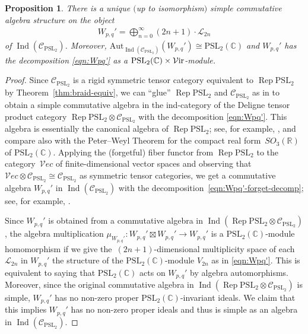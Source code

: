 \documentclass[pdftex]{sigma}
\numberwithin{equation}{section}
\newtheorem{Proposition}[Theorem]{Proposition}
\theoremstyle{definition}
\begin{document}
\begin{Proposition}\label{prop2}
There is a unique $($up to isomorphism$)$ simple commutative algebra structure on the object
\begin{gather}\label{eqn:Wpq'-forget-decomp}
W_{p,q}' =\bigoplus_{n=0}^\infty (2n+1)\cdot\mathcal{L}_{2n}
\end{gather}
of $\operatorname{Ind}(\mathcal{C}_{\mathrm{PSL}_2})$. Moreover, $\mathrm{Aut}_{\operatorname{Ind}(\mathcal{C}_{\mathrm{PSL}_2})}(W_{p,q}')\cong \mathrm{PSL}_2(\mathbb{C})$ and $W_{p,q}'$ has the decomposition \eqref{eqn:Wpq'} as a $\mathrm{PSL}_2(\mathbb{C})\times\mathcal{V}{\rm ir}$-module.
\end{Proposition}
\begin{proof}
Since $\mathcal{C}_{\mathrm{PSL}_2}$ is a rigid symmetric tensor category equivalent to $\operatorname{Rep} \mathrm{PSL}_2$ by Theorem~\ref{thm:braid-equiv}, we can ``glue'' $\operatorname{Rep} \mathrm{PSL}_2$ and $\mathcal{C}_{\mathrm{PSL}_2}$ as in \cite[Main Theorem 1]{CKM2} to obtain a simple commutative algebra in the ind-category of the Deligne tensor product category $\operatorname{Rep} \mathrm{PSL}_2\otimes\mathcal{C}_{\mathrm{PSL}_2}$ with the decomposition \eqref{eqn:Wpq'}. This algebra is essentially the canonical algebra of
$\operatorname{Rep} \mathrm{PSL}_2$; see, for example, \cite[Section 7.9]{EGNO}, and compare also with the Peter--Weyl Theorem for the compact real form~$SO_3(\mathbb{R})$ of $\mathrm{PSL}_2(\mathbb{C})$.
Applying the (forgetful) fiber functor from $\operatorname{Rep} \mathrm{PSL}_2$ to the category~$\mathcal{V}ec$ of finite-dimensional vector spaces and observing that~$\mathcal{V}ec\otimes\mathcal{C}_{\mathrm{PSL}_2}\cong\mathcal{C}_{\mathrm{PSL}_2}$ as symmetric tensor categories, we get a commutative algebra $W_{p,q}'$ in $\operatorname{Ind}(\mathcal{C}_{\mathrm{PSL}_2})$ with the decomposition~\eqref{eqn:Wpq'-forget-decomp}; see, for example, \cite[Appendix A]{MY-25-Vir}.

Since $W_{p,q}'$ is obtained from a commutative algebra in $\operatorname{Ind}(\operatorname{Rep} \mathrm{PSL}_2\otimes\mathcal{C}_{\mathrm{PSL}_2})$, the algebra multiplication $\mu_{W_{p,q}'}\colon W_{p,q}'\boxtimes W_{p,q}'\rightarrow W_{p,q}'$ is a $\mathrm{PSL}_2(\mathbb{C})$-module homomorphism if we give the~$(2n+1)$-dimensional multiplicity space of each $\mathcal{L}_{2n}$ in $W_{p,q}'$ the structure of the $\mathrm{PSL}_2(\mathbb{C})$-module $V_{2n}$ as in \eqref{eqn:Wpq'}. This is equivalent to saying that $\mathrm{PSL}_2(\mathbb{C})$ acts on $W_{p,q}'$ by algebra automorphisms. Moreover, since the original commutative algebra in $\operatorname{Ind}(\operatorname{Rep} \mathrm{PSL}_2\otimes\mathcal{C}_{\mathrm{PSL}_2})$ is simple, $W_{p,q}'$ has no non-zero proper $\mathrm{PSL}_2(\mathbb{C})$-invariant ideals. We claim that this implies $W_{p,q}'$ has no non-zero proper ideals and thus is simple as an algebra in $\operatorname{Ind}(\mathcal{C}_{\mathrm{PSL}_2})$.


\end{proof}
\end{document}
